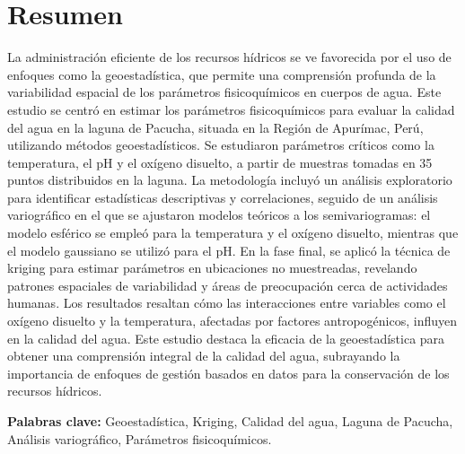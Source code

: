 \newpage
\section*{Resumen}

La administración eficiente de los recursos hídricos se ve favorecida por el uso de enfoques como la geoestadística, que permite una comprensión profunda de la variabilidad espacial de los parámetros fisicoquímicos en cuerpos de agua. Este estudio se centró en estimar los parámetros fisicoquímicos para evaluar la calidad del agua en la laguna de Pacucha, situada en la Región de Apurímac, Perú, utilizando métodos geoestadísticos. Se estudiaron parámetros críticos como la temperatura, el pH y el oxígeno disuelto, a partir de muestras tomadas en 35 puntos distribuidos en la laguna. La metodología incluyó un análisis exploratorio para identificar estadísticas descriptivas y correlaciones, seguido de un análisis variográfico en el que se ajustaron modelos teóricos a los semivariogramas: el modelo esférico se empleó para la temperatura y el oxígeno disuelto, mientras que el modelo gaussiano se utilizó para el pH. En la fase final, se aplicó la técnica de kriging para estimar parámetros en ubicaciones no muestreadas, revelando patrones espaciales de variabilidad y áreas de preocupación cerca de actividades humanas. Los resultados resaltan cómo las interacciones entre variables como el oxígeno disuelto y la temperatura, afectadas por factores antropogénicos, influyen en la calidad del agua. Este estudio destaca la eficacia de la geoestadística para obtener una comprensión integral de la calidad del agua, subrayando la importancia de enfoques de gestión basados en datos para la conservación de los recursos hídricos.


\textbf{Palabras clave:} Geoestadística, Kriging, Calidad del agua, Laguna de Pacucha, Análisis variográfico, Parámetros fisicoquímicos.



